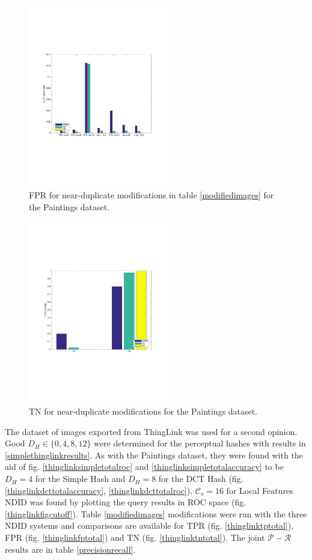 \documentclass[english,12pt,a4paper,pdftex,elec,utf8, table]{aaltothesis}
\begin{document}
\begin{figure}[htb]
\begin{center}
\includegraphics[height=8cm]{figures/fpBar}
\end{center}
\caption{ FPR for near-duplicate modifications in table \ref{modifiedimages} for the Paintings dataset.}
\label{fptotal}
\end{figure}

\begin{figure}[htb]
\begin{center}
\includegraphics[height=8cm]{figures/tnBar}
\end{center}
\caption{ TN for near-duplicate modifications for the Paintings dataset.}
\label{tntotal}
\end{figure}

The dataset of images exported from ThingLink was used for a second opinion. Good $D_H \in \{0,4,8,12\}$ were determined for the perceptual hashes with results in \ref{simplethinglinkresults}. As with the Paintings dataset, they were found with the aid of fig. \ref{thinglinksimpletotalroc} and \ref{thinglinksimpletotalaccuracy} to be $D_H=4$ for the Simple Hash and $D_H=8$ for the DCT Hash (fig. \ref{thinglinkdcttotalaccuracy}, \ref{thinglinkdcttotalroc}). $\mathcal{C}_s=16$ for Local Features NDID was found by plotting the query results in ROC space (fig. \ref{thinglinkfigcutoff}). Table \ref{modifiedimages} modifications were run with the three NDID systems and comparisons are available for TPR (fig. \ref{thinglinktptotal}), FPR (fig. \ref{thinglinkfptotal}) and TN (fig. \ref{thinglinktntotal}). The joint $\mathcal{P}-\mathcal{R}$ results are in table \ref{precisionrecall}.
\end{document}
